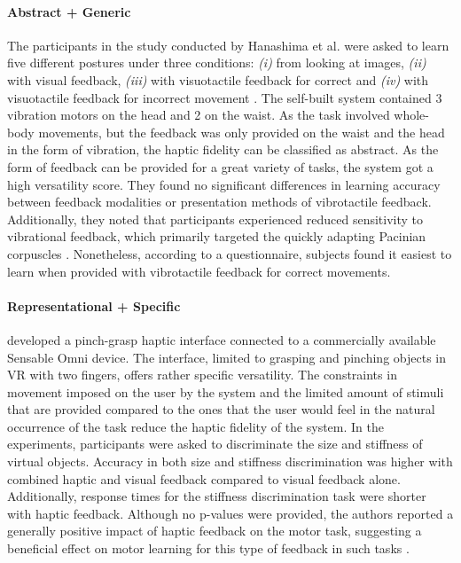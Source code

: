 \paragraph{Abstract + Generic} \label{sec:abstractgeneric}
The participants in the study conducted by Hanashima et al. were asked to learn five different postures under three conditions: \textit{(i)} from looking at images, \textit{(ii)} with visual feedback, \textit{(iii)} with visuotactile feedback for correct and \textit{(iv)} with visuotactile feedback for incorrect movement \cite{Hanashima2023}. The self-built system contained 3 vibration motors on the head and 2 on the waist. As the task involved whole-body movements, but the feedback was only provided on the waist and the head in the form of vibration, the haptic fidelity can be classified as abstract. As the form of feedback can be provided for a great variety of tasks, the system got a high versatility score. 
They found no significant differences in learning accuracy between feedback modalities or presentation methods of vibrotactile feedback. Additionally, they noted that participants experienced reduced sensitivity to vibrational feedback, which primarily targeted the quickly adapting Pacinian corpuscles \cite{Hanashima2023}. Nonetheless, according to a questionnaire, subjects found it easiest to learn when provided with vibrotactile feedback for correct movements.


\paragraph{Representational + Specific} \label{sec:representationalspecific}
\cite{Najdovski2020} developed a pinch-grasp haptic interface connected to a commercially available Sensable Omni device. The interface, limited to grasping and pinching objects in VR with two fingers, offers rather specific versatility. The constraints in movement imposed on the user by the system and the limited amount of stimuli that are provided compared to the ones that the user would feel in the natural occurrence of the task reduce the haptic fidelity of the system. 
In the experiments, participants were asked to discriminate the size and stiffness of virtual objects. Accuracy in both size and stiffness discrimination was higher with combined haptic and visual feedback compared to visual feedback alone. Additionally, response times for the stiffness discrimination task were shorter with haptic feedback. Although no p-values were provided, the authors reported a generally positive impact of haptic feedback on the motor task, suggesting a beneficial effect on motor learning for this type of feedback in such tasks \cite{Najdovski2020}. 

